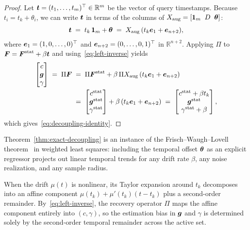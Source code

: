 \begin{proof}
Let $\boldsymbol{t} = (t_1, \dots, t_m)^\top \in \mathbb{R}^m$ be the vector of query timestamps. Because $t_i = t_k + \theta_i$, we can write $\boldsymbol{t}$ in terms of the columns of $X_{\mathrm{aug}} = [\mathbf{1}_m \;\; D \;\; \boldsymbol{\theta}]$:
\begin{equation*}
  \boldsymbol{t} \;=\; t_k\,\mathbf{1}_m + \boldsymbol{\theta} \;=\; X_{\mathrm{aug}}\,(t_k \boldsymbol{e}_1 + \boldsymbol{e}_{n+2}),
\end{equation*}
where $\boldsymbol{e}_1 = (1, 0, \dots, 0)^\top$ and $\boldsymbol{e}_{n+2} = (0, \dots, 0, 1)^\top$ in $\mathbb{R}^{n+2}$.
Applying $\Pi$ to $\boldsymbol{F} = \boldsymbol{F}^{\mathrm{stat}} + \beta \boldsymbol{t}$ and using~\eqref{eq:left-inverse} yields
\begin{align*}
  \begin{bmatrix}c\\\boldsymbol{g}\\\gamma\end{bmatrix}
  \;=\; \Pi \boldsymbol{F}
  &\;=\; \Pi \boldsymbol{F}^{\mathrm{stat}} + \beta\,\Pi X_{\mathrm{aug}}\,(t_k \boldsymbol{e}_1 + \boldsymbol{e}_{n+2}) \\
  &\;=\; \begin{bmatrix}c^{\mathrm{stat}}\\\boldsymbol{g}^{\mathrm{stat}}\\\gamma^{\mathrm{stat}}\end{bmatrix}
  + \beta\,(t_k \boldsymbol{e}_1 + \boldsymbol{e}_{n+2})
  \;=\; \begin{bmatrix}c^{\mathrm{stat}} + \beta t_k\\\boldsymbol{g}^{\mathrm{stat}}\\\gamma^{\mathrm{stat}} + \beta\end{bmatrix},
\end{align*}
which gives~\eqref{eq:decoupling-identity}.
\end{proof}

\begin{remark}
\label{rem:significance}
Theorem~\ref{thm:exact-decoupling} is an instance of the Frisch--Waugh--Lovell theorem~\cite{FrischWaugh1933,Lovell1963} in weighted least squares: including the temporal offset $\boldsymbol{\theta}$ as an explicit regressor projects out linear temporal trends for any drift rate $\beta$, any noise realization, and any sample radius.
\end{remark}

When the drift $\mu(t)$ is nonlinear, its Taylor expansion around $t_k$ decomposes into an affine component $\mu(t_k) + \mu'(t_k)(t - t_k)$ plus a second-order remainder. By~\eqref{eq:left-inverse}, the recovery operator $\Pi$ maps the affine component entirely into $(c,\gamma)$, so the estimation bias in $\boldsymbol{g}$ and $\gamma$ is determined solely by the second-order temporal remainder across the active set.

